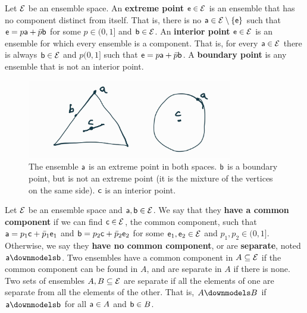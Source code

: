 \begin{mathSection}
\begin{defn}
	Let $\Ens$ be an ensemble space. An \textbf{extreme point} $\ens \in \Ens$ is an ensemble that has no component distinct from itself. That is, there is no $\ens[a] \in \Ens\setminus\{ \ens \}$ such that $\ens = p \ens[a] + \bar{p} \ens[b]$ for some $p \in (0,1]$ and $\ens[b] \in \Ens$. An \textbf{interior point} $\ens \in \Ens$ is an ensemble for which every ensemble is a component. That is, for every $\ens[a] \in \Ens$ there is always $\ens[b] \in \Ens$ and $p(0,1]$ such that $\ens = p \ens[a] + \bar{p} \ens[b]$. A \textbf{boundary point} is any ensemble that is not an interior point.
\end{defn}

\begin{figure}[H]
	\centering
	\includegraphics[width=0.8\textwidth]{tempimages/InteriorExteriorPoints.jpg}
	\caption{The ensemble $\ens[a]$ is an extreme point in both spaces. $\ens[b]$ is a boundary point, but is not an extreme point (it is the mixture of the vertices on the same side). $\ens[c]$ is an interior point.}
\end{figure}

\begin{defn}
	Let $\Ens$ be an ensemble space and $\ens[a], \ens[b] \in \Ens$. We say that they \textbf{have a common component} if we can find $\ens[c] \in \Ens$, the common component, such that $\ens[a] = p_1 \ens[c] + \bar{p}_1 \ens_1$ and $\ens[b] = p_2 \ens[c] + \bar{p}_2 \ens_2$ for some $\ens_1, \ens_2 \in \Ens$ and $p_1, p_2 \in (0,1]$. Otherwise, we say they \textbf{have no common component}, or are \textbf{separate}, noted $\ens[a] \separate \ens[b]$. Two ensembles have a common component in $A \subseteq \Ens$ if the common component can be found in $A$, and are separate in $A$ if there is none. Two sets of ensembles $A, B \subseteq \Ens$ are separate if all the elements of one are separate from all the elements of the other. That is, $A \separate B$ if $\ens[a] \separate \ens[b]$ for all $\ens[a] \in A$ and $\ens[b] \in B$.
\end{defn}


\end{mathSection}
